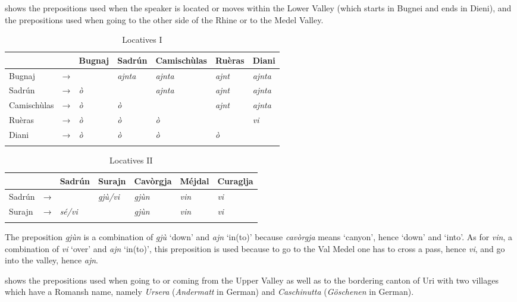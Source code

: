  shows the prepositions used when the speaker is located or moves within the Lower Valley (which starts in Bugnei and ends in Dieni), and  the prepositions used when going to the other side of the Rhine or to the Medel Valley.

\begin{table}
	\caption{Locatives I}
	\label{loc1}
	\begin{tabular}{lllllll}
		\lsptoprule
		& & Bugnaj & Sadrún & Camischùlas & Ruèras & Diani \\
		\midrule
		Bugnaj  & →& \longrule  & \textit{ajnta} & \textit{ajnta} & \textit{ajnt} & \textit{ajnta}\\
		Sadrún & → & \textit{ò}  & \longrule & \textit{ajnta} & \textit{ajnt} & \textit{ajnta}\\
		Camischùlas & →& \textit{ò} & \textit{ò} & \longrule & \textit{ajnt} & \textit{ajnta}\\
		Ruèras & →& \textit{ò} & \textit{ò} & \textit{ò} & \longrule & \textit{vi}\\
		Diani & →& \textit{ò} & \textit{ò} & \textit{ò} & \textit{ò} & \longrule\\
		\lspbottomrule
	\end{tabular}
\end{table}

\begin{table}
	\caption{Locatives II}
	\label{loc2}
	\begin{tabular}{lllllll}
		\lsptoprule
		& & Sadrún & Surajn & Cavòrgja & Méjdal & Curaglja\\ 
		\midrule
		Sadrún  &    →& \longrule & \textit{gjù/vi}  & \textit{gjùn}    & \textit{vin} & \textit{vi}\\
		Surajn  &   → &  \textit{sé/vi} & \longrule & \textit{gjùn}    & \textit{vin} & \textit{vi}   \\
		\lspbottomrule
	\end{tabular}
\end{table}

The preposition \textit{gjùn} is a combination of \textit{gjù} `down' and \textit{ajn} `in(to)' because \textit{cavòrgja} means `canyon', hence `down' and `into'. As for \textit{vin}, a combination of \textit{vi} `over' and \textit{ajn} `in(to)', this preposition is used because to go to the Val Medel one has to cross a pass, hence \textit{vi}, and go into the valley, hence \textit{ajn}.

 shows the prepositions used when going to or coming from the Upper Valley as well as to the bordering canton of Uri with two villages which have a Romansh name, namely \textit{Ursera} (\textit{Andermatt} in German) and \textit{Caschinutta} (\textit{Göschenen} in German).

